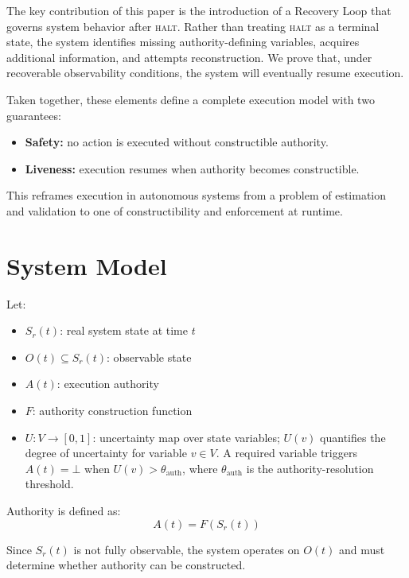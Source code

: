 \documentclass[11pt]{article}
\begin{document}
The key contribution of this paper is the introduction of a Recovery Loop that governs
system behavior after \textsc{halt}. Rather than treating \textsc{halt} as a terminal
state, the system identifies missing authority-defining variables, acquires additional
information, and attempts reconstruction. We prove that, under recoverable observability
conditions, the system will eventually resume execution.

Taken together, these elements define a complete execution model with two guarantees:

\begin{itemize}
  \item \textbf{Safety:} no action is executed without constructible authority.
  \item \textbf{Liveness:} execution resumes when authority becomes constructible.
\end{itemize}

This reframes execution in autonomous systems from a problem of estimation and validation
to one of constructibility and enforcement at runtime.

\section{System Model}

Let:
\begin{itemize}
  \item $S_r(t)$: real system state at time $t$
  \item $O(t) \subseteq S_r(t)$: observable state
  \item $A(t)$: execution authority
  \item $F$: authority construction function
  \item $U: V \to [0,1]$: uncertainty map over state variables; $U(v)$ quantifies the
        degree of uncertainty for variable $v \in V$. A required variable triggers
        $A(t) = \bot$ when $U(v) > \theta_{\mathrm{auth}}$, where
        $\theta_{\mathrm{auth}}$ is the authority-resolution threshold.
\end{itemize}

Authority is defined as:
\[
  A(t) = F(S_r(t))
\]

Since $S_r(t)$ is not fully observable, the system operates on $O(t)$ and must determine
whether authority can be constructed.
\end{document}
